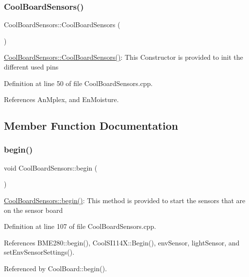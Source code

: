 \subsubsection{\texorpdfstring{Cool\+Board\+Sensors()}{CoolBoardSensors()}}
{\footnotesize\ttfamily Cool\+Board\+Sensors\+::\+Cool\+Board\+Sensors (\begin{DoxyParamCaption}{ }\end{DoxyParamCaption})}

\hyperlink{class_cool_board_sensors_a91ff2a02f5486f90cf2413a1cf8a9ed4}{Cool\+Board\+Sensors\+::\+Cool\+Board\+Sensors()}\+: This Constructor is provided to init the different used pins 

Definition at line 50 of file Cool\+Board\+Sensors.\+cpp.



References An\+Mplex, and En\+Moisture.



\subsection{Member Function Documentation}
\mbox{\label{class_cool_board_sensors_a97095823ef7c8f5290812f1405b966b3}} 
\subsubsection{\texorpdfstring{begin()}{begin()}}
{\footnotesize\ttfamily void Cool\+Board\+Sensors\+::begin (\begin{DoxyParamCaption}{ }\end{DoxyParamCaption})}

\hyperlink{class_cool_board_sensors_a97095823ef7c8f5290812f1405b966b3}{Cool\+Board\+Sensors\+::begin()}\+: This method is provided to start the sensors that are on the sensor board 

Definition at line 107 of file Cool\+Board\+Sensors.\+cpp.



References B\+M\+E280\+::begin(), Cool\+S\+I114\+X\+::\+Begin(), env\+Sensor, light\+Sensor, and set\+Env\+Sensor\+Settings().



Referenced by Cool\+Board\+::begin().

